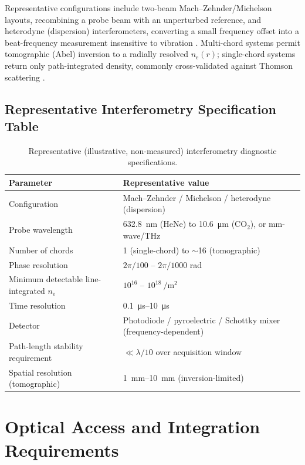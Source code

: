 Representative configurations include two-beam Mach--Zehnder/Michelson layouts, recombining a probe beam with an unperturbed reference, and heterodyne (dispersion) interferometers, converting a small frequency offset into a beat-frequency measurement insensitive to vibration \cite{ref0400}. Multi-chord systems permit tomographic (Abel) inversion to a radially resolved $n_{\mathrm{e}}(r)$; single-chord systems return only path-integrated density, commonly cross-validated against Thomson scattering \cite{ref0391}.

\subsection{Representative Interferometry Specification Table}

\begin{table}[htbp]
\centering
\caption{Representative (illustrative, non-measured) interferometry diagnostic specifications.}
\label{tab:interferometry-specs}
\begin{tabular}{@{}ll@{}}
\toprule
Parameter & Representative value \\
\midrule
Configuration & Mach--Zehnder / Michelson / heterodyne (dispersion) \\
Probe wavelength & \SI{632.8}{\nano\meter} (HeNe) to \SI{10.6}{\micro\meter} (CO$_2$), or mm-wave/THz \\
Number of chords & 1 (single-chord) to $\sim$16 (tomographic) \\
Phase resolution & $2\pi/100$ -- $2\pi/1000$ rad \\
Minimum detectable line-integrated $n_{\mathrm{e}}$ & $10^{16}$ -- $10^{18}\ \si{\per\meter\squared}$ \\
Time resolution & \SIrange{0.1}{10}{\micro\second} \\
Detector & Photodiode / pyroelectric / Schottky mixer (frequency-dependent) \\
Path-length stability requirement & $\ll \lambda/10$ over acquisition window \\
Spatial resolution (tomographic) & \SIrange{1}{10}{\milli\meter} (inversion-limited) \\
\bottomrule
\end{tabular}
\end{table}

\section{Optical Access and Integration Requirements}
\label{sec:specs-integration}

